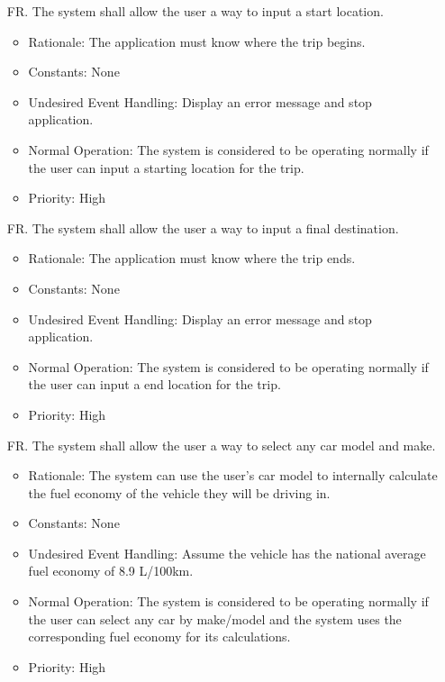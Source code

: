 \documentclass[12pt]{article}
\newcounter{reqnum} %
\begin{document}
\noindent \begin{itemize}

\item[FR\refstepcounter{reqnum}\thereqnum. ] The system shall allow the user a way to input a start location.
\begin{itemize}
    \item Rationale: The application must know where the trip begins.
    \item Constants: None
    \item Undesired Event Handling: Display an error message and stop application.
    \item Normal Operation: The system is considered to be operating normally if the user can input a starting location for the trip.
	\item Priority: High
\end{itemize}

\item[FR\refstepcounter{reqnum}\thereqnum. ] The system shall allow the user a way to input a final destination.
\begin{itemize}
    \item Rationale: The application must know where the trip ends.
    \item Constants: None
    \item Undesired Event Handling: Display an error message and stop application.
    \item Normal Operation: The system is considered to be operating normally if the user can input a end location for the trip.
	\item Priority: High
\end{itemize}

\item[FR\refstepcounter{reqnum}\thereqnum. ] The system shall allow the user a way to select any car model and make.
\begin{itemize}
    \item Rationale: The system can use the user’s car model to internally calculate the fuel economy of the vehicle they will be driving in.
    \item Constants: None
    \item Undesired Event Handling: Assume the vehicle has the national average fuel economy of 8.9 L/100km.
    \item Normal Operation: The system is considered to be operating normally if the user can select any car by make/model and the system uses the corresponding fuel economy for its calculations.
	\item Priority: High
\end{itemize}


\end{itemize}
\end{document}
